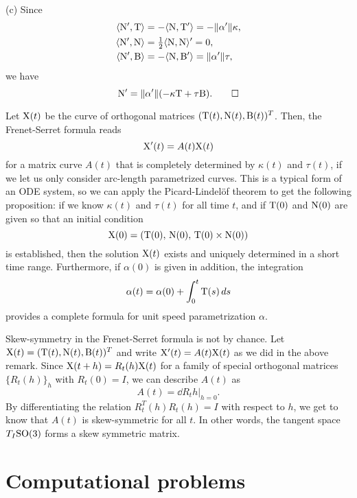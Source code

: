 \documentclass{../note}
\def\a{\alpha}
\begin{document}
\begin{prb}
\begin{pf}
(c)
Since
\begin{align*}
\<\rN',\rT\>&=-\<\rN,\rT'\>=-\|\a'\|\kappa,\\
\<\rN',\rN\>&=\tfrac12\<\rN,\rN\>'=0,\\
\<\rN',\rB\>&=-\<\rN,\rB'\>=\|\a'\|\tau,
\end{align*}
we have
\[\rN'=\|\a'\|(-\kappa\rT+\tau\rB).\qedhere\]
\end{pf}
\begin{rmk}
Let $\mathrm{X}(t)$ be the curve of orthogonal matrices $(\mathrm{T}(t),\mathrm{N}(t),\mathrm{B}(t))^T$.
Then, the Frenet-Serret formula reads
\[\mathrm{X}'(t)=A(t)\mathrm{X}(t)\]
for a matrix curve $A(t)$ that is completely determined by $\kappa(t)$ and $\tau(t)$, if we let us only consider arc-length parametrized curves.
This is a typical form of an ODE system, so we can apply the Picard-Lindel\"of theorem to get the following proposition: if we know $\kappa(t)$ and $\tau(t)$ for all time $t$, and if $\mathrm{T}(0)$ and $\mathrm{N}(0)$ are given so that an initial condition
\[\mathrm{X}(0)=(\mathrm{T}(0),\,\mathrm{N}(0),\,\mathrm{T}(0)\times\mathrm{N}(0))\]
is established, then the solution $\mathrm{X}(t)$ exists and uniquely determined in a short time range.
Furthermore, if $\a(0)$ is given in addition, the integration
\[\a(t)=\a(0)+\int_0^t\rT(s)\,ds\]
provides a complete formula for unit speed parametrization $\a$.
\end{rmk}
\begin{rmk}
Skew-symmetry in the Frenet-Serret formula is not by chance.
Let $\mathrm{X}(t)=(\mathrm{T}(t),\mathrm{N}(t),\mathrm{B}(t))^T$ and write $\mathrm{X}'(t)=A(t)\mathrm{X}(t)$ as we did in the above remark.
Since $\mathrm{X}(t+h)=R_t(h)\mathrm{X}(t)$ for a family of special orthogonal matrices $\{R_t(h)\}_h$ with $R_t(0)=I$, we can describe $A(t)$ as 
\[A(t)=\left.\dd{R_t}{h}\right\rvert_{h=0}.\]
By differentiating the relation $R_t^T(h)R_t(h)=I$ with respect to $h$, we get to know that $A(t)$ is skew-symmetric for all $t$.
In other words, the tangent space $T_I\mathrm{SO}(3)$ forms a skew symmetric matrix.
\end{rmk}













\section{Computational problems}


\end{prb}
\end{document}
